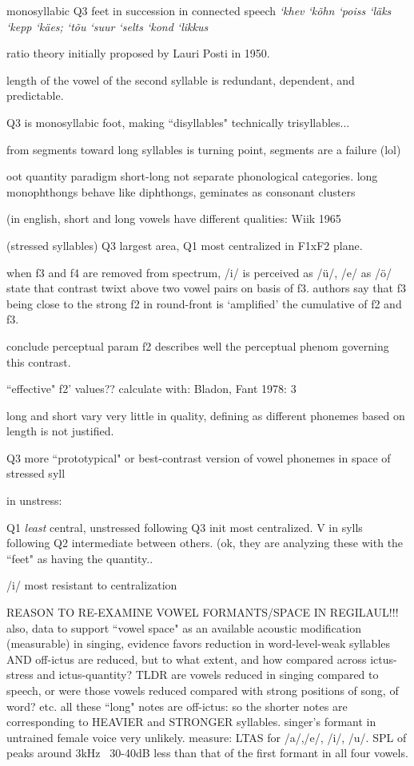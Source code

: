monosyllabic Q3 feet in succession in connected speech {\it `khev `kõhn `poiss `läks `kepp `käes; `tõu `suur `selts `kond `likkus}

ratio theory initially proposed by Lauri Posti in 1950. 

length of the vowel of the second syllable is redundant, dependent, and predictable. 

Q3 is monosyllabic foot, making ``disyllables" technically trisyllables... 

from segments toward long syllables is turning point, segments are a failure (lol) 
\cite{hintUralic98}

oot quantity paradigm
short-long not separate phonological categories. long monophthongs behave like diphthongs, geminates as consonant clusters

(in english, short and long vowels have different qualities: Wiik 1965

(stressed syllables) Q3 largest area, Q1 most centralized in F1xF2 plane. 
\par

when f3 and f4 are removed from spectrum, /i/ is perceived as /ü/, /e/ as /ö/
state that contrast twixt above two vowel pairs on basis of f3. authors say that f3 being close to the strong f2 in round-front is `amplified' the cumulative of f2 and f3.

conclude perceptual param f2 describes well the perceptual phenom governing this contrast. 

``effective" f2' values??
calculate with: Bladon, Fant 1978: 3 

long and short vary very little in quality, defining as different phonemes based on length is not justified. 

Q3 more ``prototypical" or best-contrast version of vowel phonemes in space of stressed syll

in unstress: 

Q1 {\it least} central, unstressed following Q3 init most centralized. V in sylls following Q2 intermediate between others. (ok, they are analyzing these with the ``feet" as having the quantity.. 

/i/ most resistant to centralization

\cite{rossFormants90}
REASON TO RE-EXAMINE VOWEL FORMANTS/SPACE IN  REGILAUL!!! 
also, data to support ``vowel space" as an available acoustic modification (measurable) in 
singing, evidence favors reduction in word-level-weak syllables AND off-ictus are reduced, 
but to what extent, and how compared across ictus-stress and ictus-quantity?
TLDR are vowels reduced in singing compared to speech, or were those vowels reduced compared with strong positions of song, of word? etc. 
all these ``long" notes are off-ictus: so the shorter notes are corresponding to HEAVIER and STRONGER syllables. 
singer's formant in untrained female voice very unlikely. measure: LTAS for /a/,/e/, /i/, /u/. SPL of peaks around 3kHz ~30-40dB less than that of the first formant in all four vowels. 



